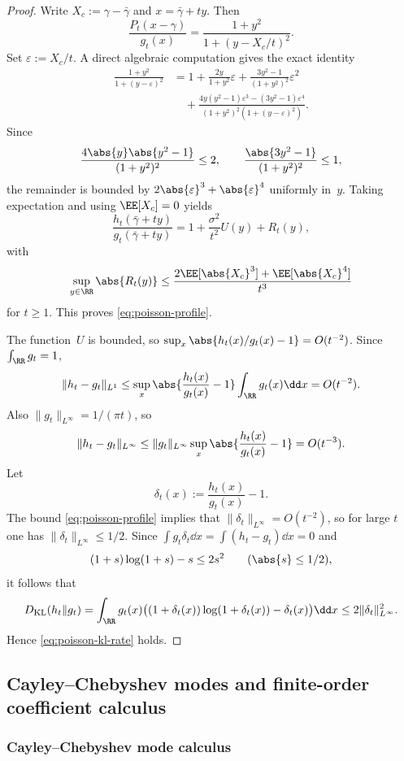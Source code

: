 \begin{proof}
Write $X_c:=\gamma-\bar{\gamma}$ and $x=\bar{\gamma}+ty$.  Then
\[
\frac{P_t(x-\gamma)}{g_t(x)}
=\frac{1+y^{2}}{1+(y-X_c/t)^{2}}.
\]
Set $\varepsilon:=X_c/t$.  A direct algebraic computation gives the
exact identity
\begin{align*}
\frac{1+y^{2}}{1+(y-\varepsilon)^{2}}
&=1+\frac{2y}{1+y^{2}}\varepsilon
+\frac{3y^{2}-1}{(1+y^{2})^{2}}\varepsilon^{2} \\
&\quad
+\frac{4y(y^{2}-1)\varepsilon^{3}-(3y^{2}-1)\varepsilon^{4}}
{(1+y^{2})^{2}(1+(y-\varepsilon)^{2})}.
\end{align*}
Since
\[
\frac{4\abs{y}\abs{y^{2}-1}}{(1+y^{2})^{2}}\le 2,
\qquad
\frac{\abs{3y^{2}-1}}{(1+y^{2})^{2}}\le 1,
\]
the remainder is bounded by $2\abs{\varepsilon}^{3}+\abs{\varepsilon}^{4}$
uniformly in~$y$.  Taking expectation and using $\EE[X_c]=0$ yields
\[
\frac{h_t(\bar{\gamma}+ty)}{g_t(\bar{\gamma}+ty)}
=1+\frac{\sigma^{2}}{t^{2}}U(y)+R_t(y),
\]
with
\[
\sup_{y\in\RR}\abs{R_t(y)}
\le \frac{2\EE[\abs{X_c}^{3}]+\EE[\abs{X_c}^{4}]}{t^{3}}
\]
for $t\ge 1$.  This proves \eqref{eq:poisson-profile}.

The function~$U$ is bounded, so
$\sup_x\abs{h_t(x)/g_t(x)-1}=O(t^{-2})$.  Since $\int_{\RR}g_t=1$,
\[
\|h_t-g_t\|_{L^1}
\le \sup_{x}\abs{\frac{h_t(x)}{g_t(x)}-1}\int_{\RR}g_t(x)\dd x
=O(t^{-2}).
\]
Also $\|g_t\|_{L^\infty}=1/(\pi t)$, so
\[
\|h_t-g_t\|_{L^\infty}
\le \|g_t\|_{L^\infty}\sup_{x}\abs{\frac{h_t(x)}{g_t(x)}-1}
=O(t^{-3}).
\]
Let
\[
\delta_t(x):=\frac{h_t(x)}{g_t(x)}-1.
\]
The bound \eqref{eq:poisson-profile} implies that
$\|\delta_t\|_{L^\infty}=O(t^{-2})$, so for large $t$ one has
$\|\delta_t\|_{L^\infty}\le 1/2$.  Since
$\int g_t\delta_t\dd x=\int(h_t-g_t)\dd x=0$ and
\[
(1+s)\log(1+s)-s\le 2s^{2}
\qquad(\abs{s}\le 1/2),
\]
it follows that
\[
D_{\mathrm{KL}}(h_t\|g_t)
=\int_{\RR}g_t(x)\bigl((1+\delta_t(x))\log(1+\delta_t(x))-\delta_t(x)\bigr)\dd x
\le 2\|\delta_t\|_{L^\infty}^{2}.
\]
Hence \eqref{eq:poisson-kl-rate} holds.
\end{proof}

\subsection{Cayley--Chebyshev modes and finite-order coefficient calculus}
\label{subsec:entropy-coefficient-package}

\subsubsection{Cayley--Chebyshev mode calculus}

